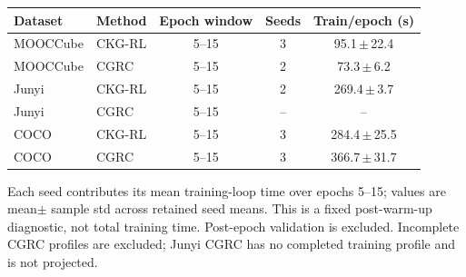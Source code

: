 \documentclass[varwidth=15cm,border=8pt]{standalone}
\begin{document}
\begin{minipage}{14cm}
\centering
{
\small
\setlength{\tabcolsep}{5pt}
\begin{tabular*}{\linewidth}{@{\extracolsep{\fill}}llccc}
\toprule
Dataset & Method & Epoch window & Seeds & Train/epoch (s) \\
\midrule
MOOCCube & CKG-RL & 5--15 & 3 & 95.1\,$\pm$\,22.4 \\
MOOCCube & CGRC & 5--15 & 2 & 73.3\,$\pm$\,6.2 \\
Junyi & CKG-RL & 5--15 & 2 & 269.4\,$\pm$\,3.7 \\
Junyi & CGRC & 5--15 & -- & -- \\
COCO & CKG-RL & 5--15 & 3 & 284.4\,$\pm$\,25.5 \\
COCO & CGRC & 5--15 & 3 & 366.7\,$\pm$\,31.7 \\
\bottomrule
\end{tabular*}
}
\label{tab:stable-epoch-timing-preview}
\vspace{2pt}
\parbox{\linewidth}{\footnotesize Each seed contributes its mean training-loop time over epochs 5--15; values are mean\(\pm\) sample std across retained seed means. This is a fixed post-warm-up diagnostic, not total training time. Post-epoch validation is excluded. Incomplete CGRC profiles are excluded; Junyi CGRC has no completed training profile and is not projected.}
\end{minipage}
\end{document}
